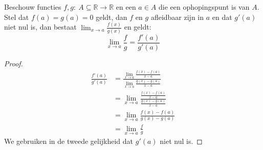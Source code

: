 \documentclass[main.tex]{subfiles}
\begin{document}
\begin{bpr}
  Beschouw functies $f,g:\ A \subseteq \mathbb{R} \rightarrow \mathbb{R}$ en een $a\in A$ die een ophopingspunt is van $A$.
  Stel dat $f(a)=g(a)=0$ geldt, dan $f$ en $g$ afleidbaar zijn in $a$ en dat $g'(a)$ niet nul is, dan bestaat $\lim_{x \rightarrow a}\frac{f(x)}{g(x)}$ en geldt:
  \[ \lim_{x\rightarrow a}\frac{f}{g}= \frac{f'(a)}{g'(a)} \]

  \begin{proof}
    \[
    \begin{array}{rl}
      \frac{f'(a)}{g'(a)}
      &= \frac{\lim_{x\rightarrow a}\frac{f(x)-f(a)}{x-a}}{\lim_{x\rightarrow a}\frac{g(x)-g(a)}{x-a}}\\
      &= \lim_{x\rightarrow a}\frac{\frac{f(x)-f(a)}{x-a}}{\frac{g(x)-g(a)}{x-a}}\\
      &= \lim_{x\rightarrow a}\frac{f(x)-f(a)}{g(x)-g(a)}\\
      &= \lim_{x\rightarrow a}\frac{f}{g}
    \end{array}
    \]
    We gebruiken in de tweede gelijkheid dat $g'(a)$ niet nul is.
  \end{proof}
\end{bpr}
\end{document}
